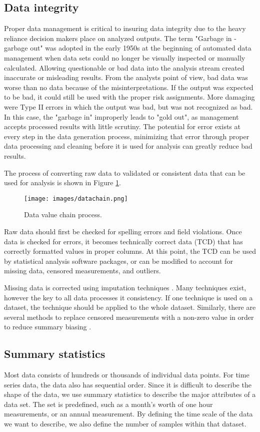 \subsection{Data integrity}
Proper data management is critical to insuring data integrity due to the heavy reliance decision makers place on analyzed outputs. The term "Garbage in - garbage out" was adopted in the early 1950s at the beginning of automated data management when data sets could no longer be visually inspected or manually calculated. Allowing questionable or bad data into the analysis stream created inaccurate or misleading results. From the analysts point of view, bad data was worse than no data because of the misinterpretations. If the output was expected to be bad, it could still be used with the proper risk assignments. More damaging were Type II errors in which the output was bad, but was not recognized as bad. In this case, the "garbage in" improperly leads to "gold out", as management accepts processed results with little scrutiny. The potential for error exists at every step in the data generation process, minimizing that error through proper data processing and cleaning before it is used for analysis can greatly reduce bad results.

The process of converting raw data to validated or consistent data that can be used for analysis is shown in Figure \ref{fig:datachain}.
%
\begin{figure}[!htpb]
\centering
\texttt{[image: images/datachain.png]} 
\caption{Data value chain process.}
\label{fig:datachain}
\end{figure}
%
Raw data should first be checked for spelling errors and field violations. Once data is checked for errors, it becomes technically correct data (TCD) that has correctly formatted values in proper columns. At this point, the TCD can be used by statistical analysis software packages, or can be modified to account for missing data, censored measurements, and outliers.

Missing data is corrected using imputation techniques \citep{Horton2007, Ellington2015}. Many techniques exist, however the key to all data processes it consistency. If one technique is used on a dataset, the technique should be applied to the whole dataset. Similarly, there are several methods to replace censored measurements with a non-zero value in order to reduce summary biasing \citep{Helsel2011}.

\subsection{Summary statistics}
Most data consists of hundreds or thousands of individual data points. For time series data, the data also has sequential order. Since it is difficult to describe the shape of the data, we use summary statistics to describe the major attributes of a data set. The set is predefined, such as a month's worth of one hour measurements, or an annual measurement. By defining the time scale of the data we want to describe, we also define the number of samples within that dataset.

